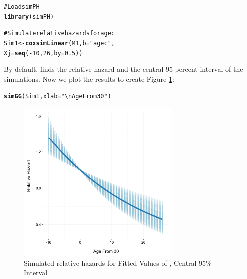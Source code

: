 \documentclass[nojss]{jss}\usepackage{graphicx, color}
\makeatletter
\newcommand{\hlfunctioncall}[1]{\textcolor[rgb]{0.501960784313725,0,0.329411764705882}{\textbf{#1}}}%
\newcommand{\hlstring}[1]{\textcolor[rgb]{0.6,0.6,1}{#1}}%
\newcommand{\hlcomment}[1]{\textcolor[rgb]{0.180392156862745,0.6,0.341176470588235}{#1}}%
\newenvironment{kframe}{%
 \def\at@end@of@kframe{}%
 \ifinner\ifhmode%
  \def\at@end@of@kframe{\end{minipage}}%
  \begin{minipage}{\columnwidth}%
 \fi\fi%
 \def\FrameCommand##1{\hskip\@totalleftmargin \hskip-\fboxsep
 \colorbox{shadecolor}{##1}\hskip-\fboxsep
     \hskip-\linewidth \hskip-\@totalleftmargin \hskip\columnwidth}%
 \MakeFramed {\advance\hsize-\width
   \@totalleftmargin\z@ \linewidth\hsize
   \@setminipage}}%
 {\par\unskip\endMakeFramed%
 \at@end@of@kframe}
\newenvironment{knitrout}{}{} %
\makeatother
\begin{document}
\begin{knitrout}
\color{fgcolor}\begin{kframe}
\begin{alltt}
\hlcomment{# Load simPH}
\hlfunctioncall{library}(simPH)

\hlcomment{# Simulate relative hazards for agec}
Sim1 <- \hlfunctioncall{coxsimLinear}(M1, b = \hlstring{"agec"}, 
                     Xj = \hlfunctioncall{seq}(-10, 26, by = 0.5))
\end{alltt}
\end{kframe}
\end{knitrout}


\noindent By default,  finds the relative hazard and the central 95 percent interval of the simulations. Now we plot the results to create Figure \ref{Linear1}:

\begin{knitrout}
\color{fgcolor}\begin{kframe}
\begin{alltt}
\hlfunctioncall{simGG}(Sim1, xlab = \hlstring{"\textbackslash{}n Age From 30"})
\end{alltt}
\end{kframe}
\end{knitrout}


\begin{figure}
	\caption{Simulated relative hazards for Fitted Values of , Central 95\% Interval}
	\label{Linear1}
	\vspace{0.3cm}
\begin{knitrout}
\color{fgcolor}

{\centering \includegraphics[width=0.7\textwidth,height=0.35\textheight]{figure/Linear4_1} 

}



\end{knitrout}

\end{figure}
\end{document}
